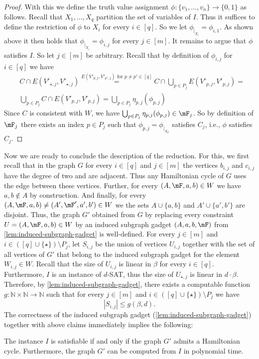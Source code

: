 \documentclass[a4paper,UKenglish,cleveref, autoref, thm-restate]{lipics-v2021}
\begin{document}
\begin{proof}
	With this we define the truth value assignment $\phi \colon \{v_1, \dots, v_n\} \to \{0,1\}$ as follows.
	Recall that $X_1, \dots, X_q$ partition the set of variables of $I$.
	Thus it suffices to define the restriction of $\phi$ to $X_i$ for every $i \in [q]$.
	So we let $\phi_{|_{X_i}} = \phi_{i,1}$.
	As shown above it then holds that $\phi_{|_{X_i}} = \phi_{i,j}$ for every $j \in [m]$.
	It remains to argue that $\phi$ satisfies $I$.
	So let $j \in [m]$ be arbitrary.
	Recall that by definition of $\phi_{i,j}$ for $i \in [q]$ we have
	\begin{align*}
		&C \cap E(V'_{\star, j}, V'_{\star, j}) \stackrel{E(V'_{p, j}, V'_{p', j}) \text { for } p \neq p' \in [q]}{=} C \cap \bigcup_{p \in P_j} E(V'_{p, j}, V'_{p, j}) = \\
		&\bigcup_{p \in P_j} C \cap E(V'_{p, j}, V'_{p, j}) = \bigcup_{p \in P_j} \eta_{p,j}(\phi_{p, j}) 
	\end{align*}
	Since $C$ is consistent with $W$, we have $\bigcup_{p \in P_j} \eta_{p,j}(\phi_{p, j}) \in \mF_j$.
	So by definition of $\mF_j$ there exists an index $p \in P_j$ such that $\phi_{p, j} = \phi_{|_{X_p}}$ satisfies $C_j$, i.e., $\phi$ satisfies $C_j$.
\end{proof}

Now we are ready to conclude the description of the reduction.
For this, we first recall that in the graph $G$ for every $i \in [q]$ and $j \in [m]$ the vertices $b_{i,j}$ and $c_{i,j}$ have the degree of two and are adjacent.
Thus any Hamiltonian cycle of $G$ uses the edge between these vertices.
Further, for every $(A, \mF, a, b) \in W$ we have $a, b \notin A$ by construction.
And finally, for every $(A, \mF, a, b) \neq (A', \mF', a', b') \in W$ we the sets $A \cup \{a, b\}$ and $A' \cup \{a', b'\}$ are disjoint.
Thus, the graph $G'$ obtained from $G$ by replacing every constraint $U = (A, \mF, a, b) \in W$ by an induced subgraph gadget $(A, a, b, \mF)$ from \cref{lem:induced-subgraph-gadget} is well-defined.
For every $j \in [m]$ and $i \in ([q] \cup \{\star\}) \setminus P_j$, let $S_{i,j}$ be the union of vertices $U_{i,j}$ together with the set of all vertices of $G'$ that belong to the induced subgraph gadget for the element $W_{i,j} \in W$.
Recall that the size of $U_{i,j}$ is linear in $\beta$ for every $i \in [q]$.
Furthermore, $I$ is an instance of $d$-SAT, thus the size of $U_{\star, j}$ is linear in $d \cdot \beta$.
Therefore, by \cref{lem:induced-subgraph-gadget}, there exists a computable function $g \colon \mathbb{N} \times \mathbb{N} \to \mathbb{N}$ such that for every $j \in [m]$ and $i \in ([q] \cup \{\star\}) \setminus P_j$ we have
\begin{equation}\label{eq:bound-sij}
	|S_{i,j}| \leq g(\beta, d).
\end{equation}
The correctness of the induced subgraph gadget (\cref{lem:induced-subgraph-gadget}) together with above claims immediately implies the following:
\begin{corollary}
	The instance $I$ is satisfiable if and only if the graph $G'$ admits a Hamiltonian cycle.  Furthermore, the graph $G'$ can be computed from $I$ in polynomial time.
\end{corollary}
\end{document}
